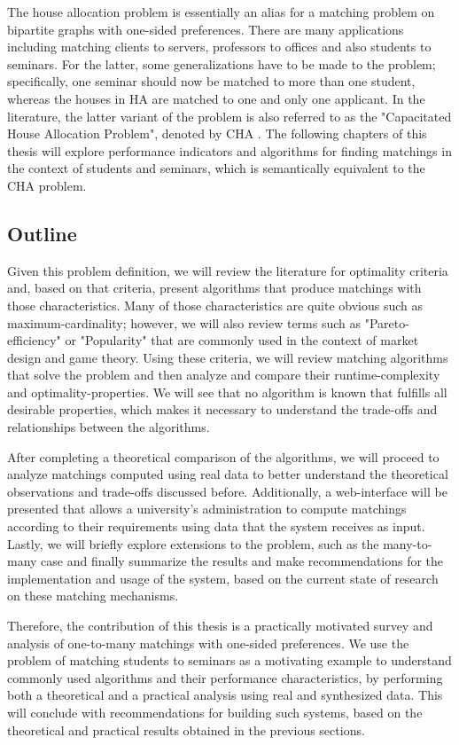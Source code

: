 The house allocation problem is essentially an alias for a matching problem on bipartite graphs with one-sided preferences. There are many applications including matching clients to servers, professors to offices and also students to seminars. For the latter, some generalizations have to be made to the problem; specifically, one seminar should now be matched to more than one student, whereas the houses in HA are matched to one and only one applicant. In the literature, the latter variant of the problem is also referred to as the "Capacitated House Allocation Problem", denoted by CHA \cite{algorithmics}. The following chapters of this thesis will explore performance indicators and algorithms for finding matchings in the context of students and seminars, which is semantically equivalent to the CHA problem.

\subsection{Outline}
Given this problem definition, we will review the literature for optimality criteria and, based on that criteria, present algorithms that produce matchings with those characteristics. Many of those characteristics are quite obvious such as maximum-cardinality; however, we will also review terms such as "Pareto-efficiency" or "Popularity" that are commonly used in the context of market design and game theory. 
Using these criteria, we will review matching algorithms that solve the problem and then analyze and compare their runtime-complexity and optimality-properties. We will see that no algorithm is known that fulfills all desirable properties, which makes it necessary to understand the trade-offs and relationships between the algorithms. 

After completing a theoretical comparison of the algorithms, we will proceed to analyze matchings computed using real data to better understand the theoretical observations and trade-offs discussed before. Additionally, a web-interface will be presented that allows a university's administration to compute matchings according to their requirements using data that the system receives as input. Lastly, we will briefly explore extensions to the problem, such as the many-to-many case and finally summarize the results and make recommendations for the implementation and usage of the system, based on the current state of research on these matching mechanisms.

Therefore, the contribution of this thesis is a practically motivated survey and analysis of one-to-many matchings with one-sided preferences. We use the problem of matching students to seminars as a motivating example to understand commonly used algorithms and their performance characteristics, by performing both a theoretical and a practical analysis using real and synthesized data. This will conclude with recommendations for building such systems, based on the theoretical and practical results obtained in the previous sections. 

